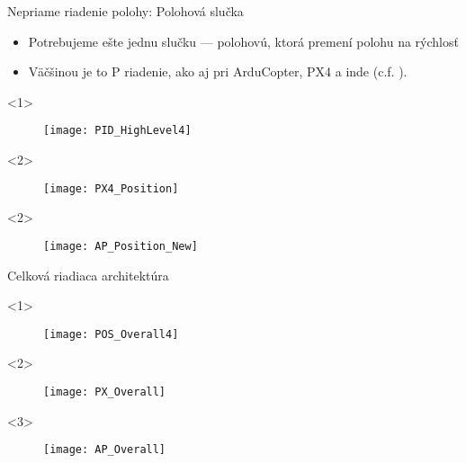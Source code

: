    \begin{frame}[t]{Nepriame riadenie polohy: Polohová slučka}
\begin{itemize}
  \item<1-> Potrebujeme ešte jednu slučku --- polohovú, ktorá premení polohu na rýchlosť

  \item<2-> Väčšinou je to P riadenie, ako aj pri ArduCopter, PX4 a inde (c.f. \cite{Saha2020}).
\end{itemize}

  \begin{onlyenv}<1>
  \begin{figure}
\centering
  \texttt{[image: PID\_HighLevel4]}\\
\end{figure}
\end{onlyenv}



  \begin{onlyenv}<2>
  \begin{figure}
\centering
  \texttt{[image: PX4\_Position]}\\
\end{figure}
\end{onlyenv}

  \begin{onlyenv}<2>
  \begin{figure}
\centering
  \texttt{[image: AP\_Position\_New]}\\
\end{figure}
\end{onlyenv}


  \end{frame}

 \begin{frame}[t]{Celková riadiaca architektúra}
  \begin{onlyenv}<1>
  \begin{figure}
\centering
  \texttt{[image: POS\_Overall4]}\\
\end{figure}
\end{onlyenv}

  \begin{onlyenv}<2>
  \begin{figure}
\centering
  \texttt{[image: PX\_Overall]}\\
\end{figure}
\end{onlyenv}


  \begin{onlyenv}<3>
  \begin{figure}
\centering
  \texttt{[image: AP\_Overall]}\\
\end{figure}
\end{onlyenv}

  \end{frame}



